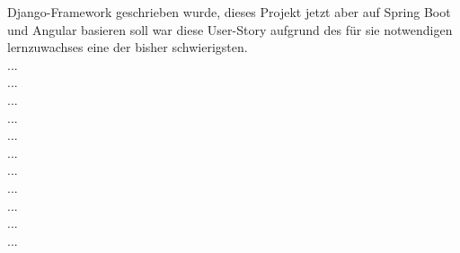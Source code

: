             Django-Framework geschrieben wurde, dieses Projekt jetzt
            aber auf Spring Boot und Angular basieren soll war diese
            User-Story aufgrund des für sie notwendigen lernzuwachses
            eine der bisher schwierigsten.\newline
        \textbf{}\\ ... \newline
        \textbf{}\\ ... \newline
        \textbf{}\\ ... \newline
        \textbf{}\\ ... \newline
        \textbf{}\\ ... \newline
        \textbf{}\\ ... \newline
        \textbf{}\\ ... \newline
        \textbf{}\\ ... \newline
        \textbf{}\\ ... \newline
        \textbf{}\\ ... \newline
        \textbf{}\\ ... \newline

